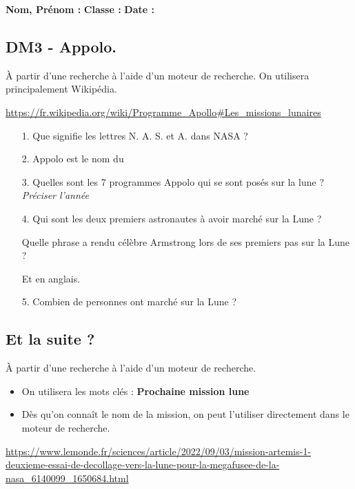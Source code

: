 



\textbf{Nom, Prénom :} \hspace{8cm} \textbf{Classe :} \hspace{3cm} \textbf{Date :}\\

\subsection*{DM3 - Appolo.}

À partir d'une recherche à l'aide d'un moteur de recherche. On utilisera principalement Wikipédia.

\url{https://fr.wikipedia.org/wiki/Programme_Apollo#Les_missions_lunaires}


\begin{enumerate}
  \item[1.]Que signifie les lettres N. A. S. et A. dans NASA ? \\
  \Pointilles[2]

  \item[2.]Appolo est le nom du \dotfill
  
  \item[3.]Quelles sont les 7 programmes Appolo qui se sont posés sur la lune ? \textit{Préciser l'année} \\
  \Pointilles[4]

  \item[4.]Qui sont les deux premiers astronautes à avoir marché sur la Lune ? \\
  \Pointilles[1]

  Quelle phrase a rendu célèbre Armstrong lors de ses premiers pas sur la Lune ? \\
  \Pointilles[2]

  Et en anglais. \\
  \Pointilles[2]

  \item[5.]Combien de personnes ont marché sur la Lune ? \\
  \Pointilles[3]
\end{enumerate}

\subsection*{Et la suite ?}

À partir d'une recherche à l'aide d'un moteur de recherche. 

\begin{itemize}
  \item On utilisera les mots clés : \textbf{Prochaine mission lune}
  \item Dès qu'on connaît le nom de la mission, on peut l'utiliser directement dans le moteur de recherche.
\end{itemize}
\url{https://www.lemonde.fr/sciences/article/2022/09/03/mission-artemis-1-deuxieme-essai-de-decollage-vers-la-lune-pour-la-megafusee-de-la-nasa_6140099_1650684.html}

